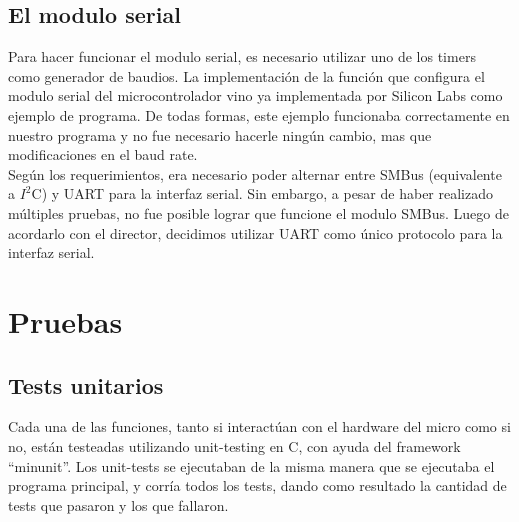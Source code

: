 
\subsection{El modulo serial} %
\label{it2:sub:el_modulo_serial}

Para hacer funcionar el modulo serial, es necesario utilizar uno de los timers como generador de baudios. La implementación de la función que configura el modulo serial del microcontrolador vino ya implementada por Silicon Labs como ejemplo de programa. De todas formas, este ejemplo funcionaba correctamente en nuestro programa y no fue necesario hacerle ningún cambio, mas que modificaciones en el baud rate. \\

Según los requerimientos, era necesario poder alternar entre SMBus (equivalente a $I^{2}$C) y UART para la interfaz serial. Sin embargo, a pesar de haber realizado múltiples pruebas, no fue posible lograr que funcione el modulo SMBus. Luego de acordarlo con el director, decidimos utilizar UART como único protocolo para la interfaz serial.



\section{Pruebas} %
\label{it2:sec:pruebas}


\subsection{Tests unitarios} %
\label{it2:sub:tests_unitarios}

Cada una de las funciones, tanto si interactúan con el hardware del micro como si no, están testeadas utilizando unit-testing en C, con ayuda del framework ``minunit''\cite{minunit}. Los unit-tests se ejecutaban de la misma manera que se ejecutaba el programa principal, y corría todos los tests, dando como resultado la cantidad de tests que pasaron y los que fallaron.

